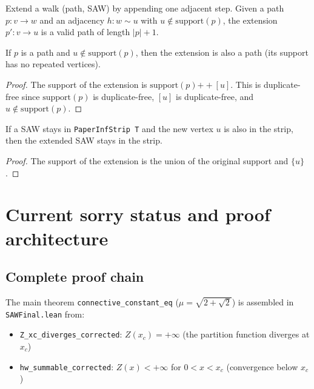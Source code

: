 \begin{lemma}
\begin{definition}\label{def:walk_extend}
\leanok
{}
  Extend a walk (path, SAW) by appending one adjacent step.
  Given a path $p : v \to w$ and an adjacency $h : w \sim u$ with
  $u \notin \mathrm{support}(p)$, the extension $p' : v \to u$ is a
  valid path of length $|p| + 1$.
\end{definition}

\begin{lemma}\label{lem:walk_extend_path}
\leanok
{}
  If $p$ is a path and $u \notin \mathrm{support}(p)$, then the extension
  is also a path (its support has no repeated vertices).
\end{lemma}
\begin{proof}\leanok
  The support of the extension is $\mathrm{support}(p) \mathbin{+\!\!+} [u]$.
  This is duplicate-free since $\mathrm{support}(p)$ is duplicate-free,
  $[u]$ is duplicate-free, and $u \notin \mathrm{support}(p)$.
\end{proof}

\begin{lemma}\label{lem:saw_extend_strip}
\leanok
{}
  If a SAW stays in \texttt{PaperInfStrip~T} and the new vertex $u$ is also
  in the strip, then the extended SAW stays in the strip.
\end{lemma}
\begin{proof}\leanok
  The support of the extension is the union of the original support and $\{u\}$.
\end{proof}

\section{Current sorry status and proof architecture}

\subsection*{Complete proof chain}
The main theorem \texttt{connective\_constant\_eq} ($\mu = \sqrt{2 + \sqrt{2}}$)
is assembled in \texttt{SAWFinal.lean} from:
\begin{itemize}
\item \texttt{Z\_xc\_diverges\_corrected}: $Z(x_c) = +\infty$ (the partition function diverges at $x_c$)
\item \texttt{hw\_summable\_corrected}: $Z(x) < +\infty$ for $0 < x < x_c$ (convergence below $x_c$)
\end{itemize}


\end{lemma}
